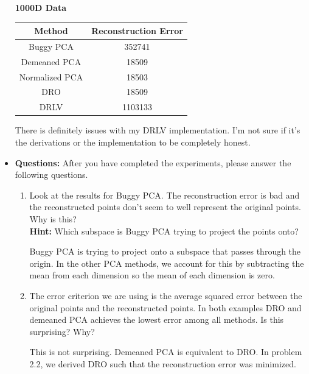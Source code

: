 \begin{itemize}
\begin{soln}
  \begin{center}
    \textbf{1000D Data} \\
    \begin{tabular}{ c  c }
      \hline
      Method & Reconstruction Error \\ \hline
      Buggy PCA & 352741 \\
      Demeaned PCA & 18509 \\
      Normalized PCA & 18503 \\
      DRO & 18509 \\
      DRLV & 1103133\\
      \hline
    \end{tabular}
  \end{center}
  There is definitely issues with my DRLV implementation.
  I'm not sure if it's the derivations or the implementation to be completely honest.
\end{soln}

\item \textbf{Questions:} After you have completed the experiments, please answer the following questions.
\begin{enumerate}
\item Look at the results for Buggy PCA. The reconstruction error is bad and the
reconstructed points don't seem to well represent the original points. Why is
this? \\
\textbf{Hint: } Which subspace is Buggy PCA trying to project the points
onto?

\begin{soln}
  Buggy PCA is trying to project onto a subspace that passes through the origin.
  In the other PCA methods, we account for this by subtracting the mean from each dimension so the mean of each dimension is zero.
\end{soln}

\item The error criterion we are using is the average squared error 
between the original points and the reconstructed points.
In both examples DRO and demeaned PCA achieves the lowest error among all
methods. 
Is this surprising? Why?

\begin{soln}
  This is not surprising.
  Demeaned PCA is equivalent to DRO.
  In problem 2.2, we derived DRO such that the reconstruction error was minimized.
\end{soln}

\end{enumerate}


\end{itemize}
